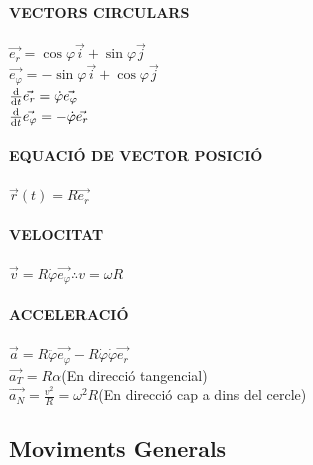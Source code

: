 \documentclass[11pt]{article}
\begin{document}
\begin{tcolorbox}[
  title=Fórmues bàsiques,
  colback=ForestGreen!5!white,
  colframe=ForestGreen!70!black,
  coltitle=white,
  colbacktitle=ForestGreen!70!black,
  fonttitle=\bfseries,
  arc=6pt,
  boxrule=0.8pt
]
\textbf{VECTORS CIRCULARS}\\
\\
$\vec{e_r} = \cos\varphi \vec{i} + \sin\varphi \vec{j} $\\
$\vec{e_{\varphi}} = -\sin\varphi \vec{i} + \cos \varphi \vec{j} $\\
$\dv{}{t} \vec{e_r} = \dot{\varphi} \vec{e_{\varphi}} $\\
$\dv{}{t} \vec{e_{\varphi}} = -\dot{\varphi} \vec{e_r} $\\
\\
\textbf{EQUACIÓ DE VECTOR POSICIÓ}\\ 
\\
$\vec{r}(t) = R \vec{e_r}$\\
\\
\textbf{VELOCITAT}\\
\\
$\vec{v} = R \dot{\varphi}\vec{e_{\varphi}} \therefore v = \omega R$ \\
\\
\textbf{ACCELERACIÓ}\\ 
\\
$\vec{a} = R\ddot{\varphi}\vec{e_{\varphi}} - R\dot{\varphi}\dot{\varphi}\vec{e_r}$\\
$\vec{a_T} = R\alpha$(En direcció tangencial)\\ 
$\vec{a_N} = \frac{v^2}{R} = \omega^2 R$(En direcció cap a dins del cercle)\\

\end{tcolorbox}

\subsection{Moviments Generals}
\end{document}
